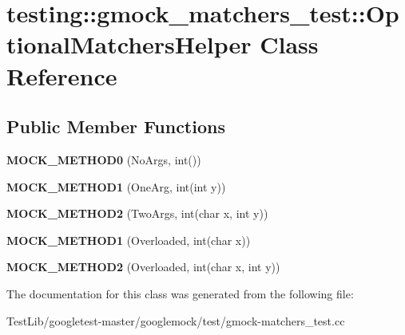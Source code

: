 \hypertarget{classtesting_1_1gmock__matchers__test_1_1OptionalMatchersHelper}{}\section{testing\+:\+:gmock\+\_\+matchers\+\_\+test\+:\+:Optional\+Matchers\+Helper Class Reference}
\label{classtesting_1_1gmock__matchers__test_1_1OptionalMatchersHelper}
\subsection*{Public Member Functions}
\begin{DoxyCompactItemize}
\item 
\mbox{\label{classtesting_1_1gmock__matchers__test_1_1OptionalMatchersHelper_a8e2a60b72259529d2b6c0f37ac47dde9}} 
{\bfseries M\+O\+C\+K\+\_\+\+M\+E\+T\+H\+O\+D0} (No\+Args, int())
\item 
\mbox{\label{classtesting_1_1gmock__matchers__test_1_1OptionalMatchersHelper_ab35fac331bbcf18e1a7e95305d4cc34d}} 
{\bfseries M\+O\+C\+K\+\_\+\+M\+E\+T\+H\+O\+D1} (One\+Arg, int(int y))
\item 
\mbox{\label{classtesting_1_1gmock__matchers__test_1_1OptionalMatchersHelper_a51f6da96a6607d70c8ea6d5f4aedb39f}} 
{\bfseries M\+O\+C\+K\+\_\+\+M\+E\+T\+H\+O\+D2} (Two\+Args, int(char x, int y))
\item 
\mbox{\label{classtesting_1_1gmock__matchers__test_1_1OptionalMatchersHelper_a782311cb85f341cf6b45f0b9f015e779}} 
{\bfseries M\+O\+C\+K\+\_\+\+M\+E\+T\+H\+O\+D1} (Overloaded, int(char x))
\item 
\mbox{\label{classtesting_1_1gmock__matchers__test_1_1OptionalMatchersHelper_a2051b793f9f68027e8861ec999739b9a}} 
{\bfseries M\+O\+C\+K\+\_\+\+M\+E\+T\+H\+O\+D2} (Overloaded, int(char x, int y))
\end{DoxyCompactItemize}


The documentation for this class was generated from the following file\+:\begin{DoxyCompactItemize}
\item 
Test\+Lib/googletest-\/master/googlemock/test/gmock-\/matchers\+\_\+test.\+cc\end{DoxyCompactItemize}
